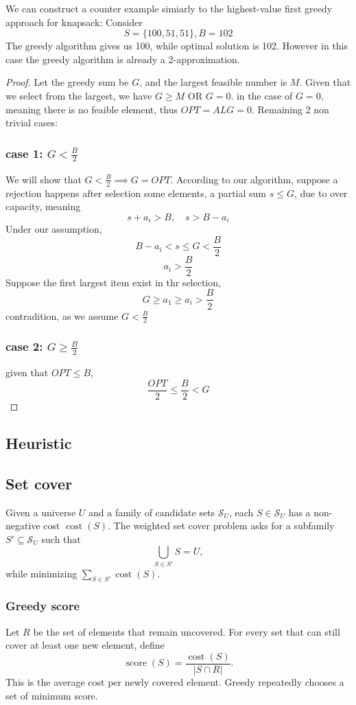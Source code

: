 \documentclass[10pt]{article}
\theoremstyle{definition}
\begin{document}
We can construct a counter example simiarly to the highest-value first greedy approach for knapsack:
Consider 
\[S = \{100, 51, 51\}, B = 102\]
The greedy algorithm gives us 100, while optimal solution is 102. However in this case the greedy algorithm is already a 2-approximation. 
\begin{proof}
  Let the greedy sum be $G$, and the largest feasible number is $M$. Given that we select from the largest, we have $G \geq M$ OR $G = 0$.
  in the case of $G = 0$, meaning there is no feaible element, thus $OPT = ALG = 0$. Remaining 2 non trivial cases: 
  \subsubsection*{case 1: $G < \frac{B}{2}$}
  We will show that $G < \frac{B}{2} \implies G = OPT$. 
  According to our algorithm, suppose a rejection happens after selection some elements, a partial sum $s \leq G$, due to over capacity, meaning
  \[s + a_i > B, \quad s > B - a_i\]
  Under our assumption, 
  \[B - a_i < s \leq G < \frac{B}{2}\]
  \[a_i > \frac{B}{2}\]
  Suppose the first largest item exist in thr selection, 
  \[G \geq a_1 \geq a_i > \frac{B}{2}\]
  contradition, as we assume $G < \frac{B}{2}$
  \subsubsection*{case 2: $G \geq \frac{B}{2}$}
  given that $OPT \leq B$, 
  \[\frac{OPT}{2} \leq \frac{B}{2} < G\]
\end{proof}


\subsection{Heuristic}
\subsection{Set cover}
Given a universe $U$ and a family of candidate sets $\mathcal{S}_U$, each
$S\in\mathcal{S}_U$ has a non-negative cost $\operatorname{cost}(S)$. The
weighted set cover problem asks for a subfamily $S'\subseteq\mathcal{S}_U$
such that
\[
  \bigcup_{S\in S'}S=U,
\]
while minimizing $\sum_{S\in S'}\operatorname{cost}(S)$.

\subsubsection*{Greedy score}
Let $R$ be the set of elements that remain uncovered. For every set that can
still cover at least one new element, define
\[
  \operatorname{score}(S)=
  \frac{\operatorname{cost}(S)}{|S\cap R|}.
\]
This is the average cost per newly covered element. Greedy repeatedly chooses
a set of minimum score.
\end{document}

